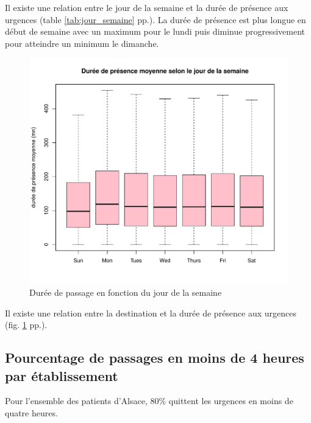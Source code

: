 \documentclass[12pt,english,french,twoside]{book}\usepackage[]{graphicx}\usepackage[]{color}
\makeatletter
\def\maxwidth{ %
  \ifdim\Gin@nat@width>\linewidth
    \linewidth
  \else
    \Gin@nat@width
  \fi
}
\newenvironment{knitrout}{}{} %
\makeatother
\begin{document}
Il existe une relation entre le jour de la semaine et la durée de présence aux urgences (table \ref{tab:jour_semaine} pp.\pageref{tab:jour_semaine}). La durée de présence est plus longue en début de semaine avec un maximum pour le lundi puis diminue progressivement pour atteindre un minimum le dimanche.

\begin{figure}[ht!]
 \centering
\begin{knitrout}
\color{fgcolor}
\includegraphics[width=\maxwidth]{figure/bp_jour_presence} 

\end{knitrout}

 \caption{Durée de passage en fonction du jour de la semaine}
 \label{duree_jour}
\end{figure}
Il existe une relation entre la destination et la durée de présence aux urgences (fig. \ref{duree_jour} pp.\pageref{duree_jour}).


\subsection{Pourcentage de passages en moins de 4 heures par établissement}




Pour l'ensemble des patients d'Alsace, 80\% quittent les urgences en moins de quatre heures.
\end{document}
